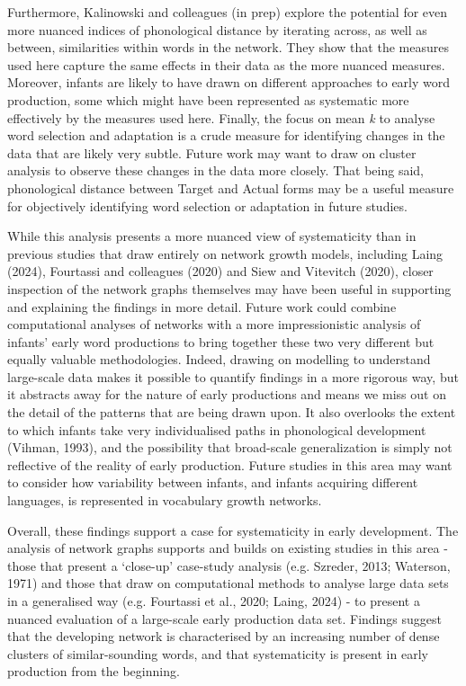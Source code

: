 \documentclass[
  man]{apa6}
\begin{document}
Furthermore, Kalinowski and colleagues (in prep) explore the potential for even more nuanced indices of phonological distance by iterating across, as well as between, similarities within words in the network. They show that the measures used here capture the same effects in their data as the more nuanced measures. Moreover, infants are likely to have drawn on different approaches to early word production, some which might have been represented as systematic more effectively by the measures used here. Finally, the focus on mean \emph{k} to analyse word selection and adaptation is a crude measure for identifying changes in the data that are likely very subtle. Future work may want to draw on cluster analysis to observe these changes in the data more closely. That being said, phonological distance between Target and Actual forms may be a useful measure for objectively identifying word selection or adaptation in future studies.

While this analysis presents a more nuanced view of systematicity than in previous studies that draw entirely on network growth models, including Laing (2024), Fourtassi and colleagues (2020) and Siew and Vitevitch (2020), closer inspection of the network graphs themselves may have been useful in supporting and explaining the findings in more detail. Future work could combine computational analyses of networks with a more impressionistic analysis of infants' early word productions to bring together these two very different but equally valuable methodologies. Indeed, drawing on modelling to understand large-scale data makes it possible to quantify findings in a more rigorous way, but it abstracts away for the nature of early productions and means we miss out on the detail of the patterns that are being drawn upon. It also overlooks the extent to which infants take very individualised paths in phonological development (Vihman, 1993), and the possibility that broad-scale generalization is simply not reflective of the reality of early production. Future studies in this area may want to consider how variability between infants, and infants acquiring different languages, is represented in vocabulary growth networks.

Overall, these findings support a case for systematicity in early development. The analysis of network graphs supports and builds on existing studies in this area - those that present a `close-up' case-study analysis (e.g. Szreder, 2013; Waterson, 1971) and those that draw on computational methods to analyse large data sets in a generalised way (e.g. Fourtassi et al., 2020; Laing, 2024) - to present a nuanced evaluation of a large-scale early production data set. Findings suggest that the developing network is characterised by an increasing number of dense clusters of similar-sounding words, and that systematicity is present in early production from the beginning.
\newpage
\end{document}
